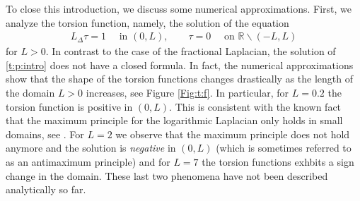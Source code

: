 \documentclass[11 pt]{article}
\numberwithin{equation}{section}
\def\R{\mathbb{R}}
\begin{document}
To close this introduction, we discuss some numerical approximations.  First, we analyze the torsion function, namely, the solution of the equation
\begin{align}\label{t:p:intro}
 L_\Delta \tau = 1\quad \text{ in }(0,L),\qquad \tau=0\quad \text{ on }\R\backslash (-L,L)
\end{align}
for $L>0$.  In contrast to the case of the fractional Laplacian, the solution of \eqref{t:p:intro} does not have a closed formula. In fact, the numerical approximations show that the shape of the torsion functions changes drastically as the length of the domain $L>0$ increases, see Figure \ref{Fig:t:f}. In particular, for $L=0.2$ the torsion function is positive in $(0,L)$.  This is consistent with the known fact that the maximum principle for the logarithmic Laplacian only holds in small domains, see \cite[Corollary 1.9]{CW19}. For $L=2$ we observe that the maximum principle does not hold anymore and the solution is \emph{negative} in $(0,L)$ (which is sometimes referred to as an antimaximum principle) and for $L=7$ the torsion functions exhbits a sign change in the domain. These last two phenomena have not been described analytically so far.
\end{document}
